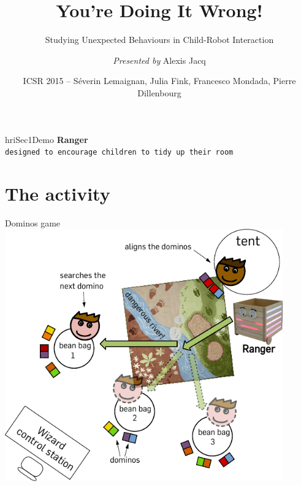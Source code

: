 \documentclass[compress]{beamer}
\title{You’re Doing It Wrong!}
\subtitle{Studying Unexpected Behaviours in Child-Robot Interaction}
\date{ICSR 2015 -- Séverin Lemaignan, Julia Fink, Francesco Mondada,
Pierre Dillenbourg}
\author{\textit{Presented by} Alexis Jacq}
\institute{Computer-Human Interaction\\for Learning and Instruction {\Medium
EPFL}}
\begin{document}
\maketitle


\begin{frame}[plain]

\begin{beamercolorbox}[wd=\linewidth,ht=6ex,dp=0.7ex]{hriSec1Demo}
    \textbf{Ranger}\\
    \scriptsize
    {\tt designed to encourage children to tidy up their room}\\
\end{beamercolorbox}
    \vfill

\end{frame}


\section{The activity}

\begin{frame}{Dominos game}
     {
    \centering
        \includegraphics[width=0.9\textwidth]{domino-setup}
    }
\end{frame}
\end{document}
